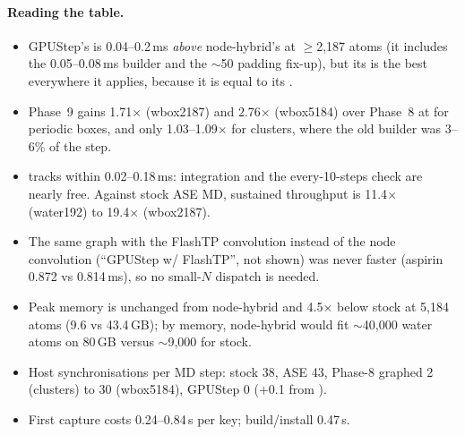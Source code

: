 \paragraph{Reading the table.}
\begin{itemize}
  \item GPUStep's \Bone{} is 0.04--0.2\,ms \emph{above} node-hybrid's at $\ge$2{,}187 atoms (it includes the 0.05--0.08\,ms builder and the $\sim$50\us{} padding fix-up), but its \Btwo{} is the best everywhere it applies, because it is equal to its \Bone{}.
  \item Phase~9 gains 1.71$\times$ (wbox2187) and 2.76$\times$ (wbox5184) over Phase~8 at \Btwo{} for periodic boxes, and only 1.03--1.09$\times$ for clusters, where the old builder was 3--6\% of the step.
  \item \Bthree{} tracks \Btwo{} within 0.02--0.18\,ms: integration and the every-10-steps check are nearly free. Against stock ASE MD, sustained throughput is 11.4$\times$ (water192) to 19.4$\times$ (wbox2187).
  \item The same graph with the FlashTP convolution instead of the node convolution (``GPUStep w/ FlashTP'', not shown) was never faster (aspirin 0.872 vs 0.814\,ms), so no small-$N$ dispatch is needed.
  \item Peak memory is unchanged from node-hybrid and 4.5$\times$ below stock at 5{,}184 atoms (9.6 vs 43.4\,GB); by memory, node-hybrid would fit $\sim$40{,}000 water atoms on 80\,GB versus $\sim$9{,}000 for stock.
  \item Host synchronisations per MD step: stock 38, ASE 43, Phase-8 graphed 2 (clusters) to 30 (wbox5184), GPUStep 0 (+0.1 from ).
  \item First capture costs 0.24--0.84\,s per key; build/install 0.47\,s.
\end{itemize}

